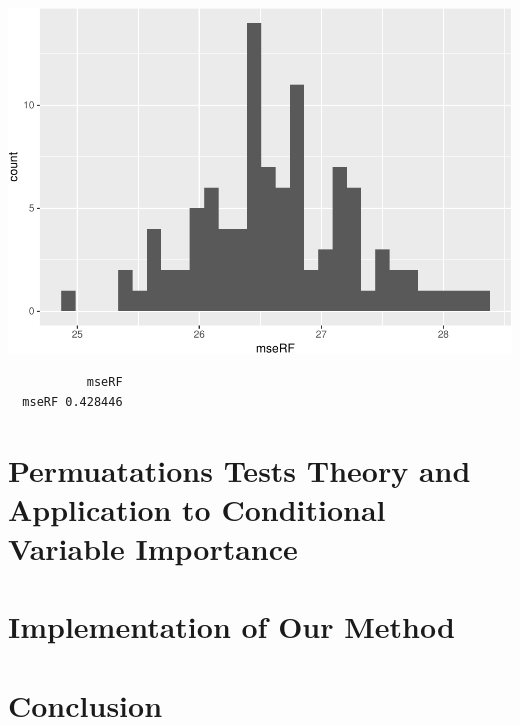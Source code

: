 \documentclass[12pt,twoside]{reedthesis}
\begin{document}
  \begin{center}\includegraphics{Thesis_files/figure-latex/unnamed-chunk-13-1} \end{center}
  
  \begin{Shaded}
  \begin{Highlighting}[]
  \end{Highlighting}
  \end{Shaded}
  
  \begin{verbatim}
           mseRF
  mseRF 0.428446
  \end{verbatim}
  
  \chapter{Permuatations Tests Theory and Application to Conditional
  Variable
  Importance}\label{permuatations-tests-theory-and-application-to-conditional-variable-importance}
  
  \chapter{Implementation of Our
  Method}\label{implementation-of-our-method}
  
  \chapter*{Conclusion}\label{conclusion}
  
  \setcounter{chapter}{4} \setcounter{section}{0}
  
\end{document}

